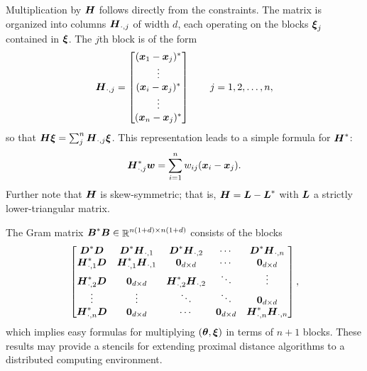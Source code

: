 \documentclass{article}
\begin{document}
Multiplication by \(\boldsymbol{H}\) follows directly from the constraints.
The matrix is organized into columns \(\boldsymbol{H}_{\cdot, j}\) of width \(d\), each operating on the blocks \(\boldsymbol{\xi}_{j}\) contained in \(\boldsymbol{\xi}\).
The \(j\)th block is of the form
\begin{equation}
    \label{eq:operator_H_redundant}
    \boldsymbol{H}_{\cdot,j}
    =
    \begin{bmatrix}
        (\boldsymbol{x}_{1} - \boldsymbol{x}_{j})^{\ast} \\
        \vdots \\
        (\boldsymbol{x}_{i} - \boldsymbol{x}_{j})^{\ast} \\
        \vdots \\
        (\boldsymbol{x}_{n} - \boldsymbol{x}_{j})^{\ast} \\
    \end{bmatrix}
    \qquad
    j = 1,2,\ldots,n,
\end{equation}
so that \(\boldsymbol{H} \boldsymbol{\xi} = \sum_{j}^{n} \boldsymbol{H}_{\cdot,j} \boldsymbol{\xi}\).
This representation leads to a simple formula for \(\boldsymbol{H}^{\ast}\):
\begin{equation}
    \label{eq:operator_Ht_redundant}
    \boldsymbol{H}_{\cdot,j}^{\ast} \boldsymbol{w}
    =
    \sum_{i=1}^{n} w_{ij} (\boldsymbol{x}_{i} - \boldsymbol{x}_{j}).
\end{equation}
Further note that \(\boldsymbol{H}\) is skew-symmetric; that is, \(\boldsymbol{H} = \boldsymbol{L} - \boldsymbol{L}^{\ast}\) with \(\boldsymbol{L}\) a strictly lower-triangular matrix.

The Gram matrix \(\boldsymbol{B}^{\ast} \boldsymbol{B} \in \mathop{\mathbb{R}}\nolimits^{n(1+d) \times n(1+d)}\) consists of the blocks
\begin{equation*}
    \begin{bmatrix}
        \boldsymbol{D}^{\ast} \boldsymbol{D}
        & \boldsymbol{D}^{\ast} \boldsymbol{H}_{\cdot,1}
        & \boldsymbol{D}^{\ast} \boldsymbol{H}_{\cdot,2}
        & \cdots
        & \boldsymbol{D}^{\ast} \boldsymbol{H}_{\cdot,n} \\
        \boldsymbol{H}_{\cdot,1}^{\ast} \boldsymbol{D}
        & \boldsymbol{H}_{\cdot,1}^{\ast} \boldsymbol{H}_{\cdot,1}
        & \boldsymbol{0}_{d \times d}
        & \cdots
        & \boldsymbol{0}_{d \times d} \\
        \boldsymbol{H}_{\cdot,2}^{\ast} \boldsymbol{D}
        & \boldsymbol{0}_{d \times d}
        & \boldsymbol{H}_{\cdot,2}^{\ast} \boldsymbol{H}_{\cdot,2}
        & \ddots
        & \vdots \\
        \vdots
        & \vdots
        & \ddots
        & \ddots
        & \boldsymbol{0}_{d \times d} \\
       \boldsymbol{H}_{\cdot,n}^{\ast} \boldsymbol{D}
        & \boldsymbol{0}_{d \times d}
        & \cdots
        & \boldsymbol{0}_{d \times d}
        &\boldsymbol{H}_{\cdot,n}^{\ast} \boldsymbol{H}_{\cdot,n}
    \end{bmatrix},
\end{equation*}
which implies easy formulas for multiplying \((\boldsymbol{\theta}, \boldsymbol{\xi})\) in terms of \(n+1\) blocks.
These results may provide a stencils for extending proximal distance algorithms to a distributed computing environment.
\end{document}
